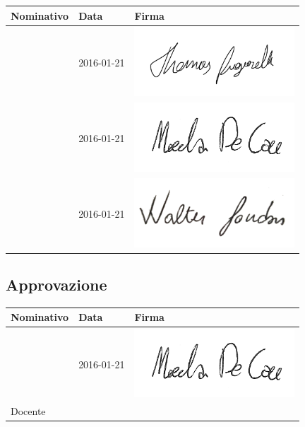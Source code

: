 \documentclass[12pt,a4paper]{article}
\begin{document}
\begin{table}[H]
	\begin{center}
		\begin{tabular}{l l l}
			\toprule
            \textbf{Nominativo}	& \textbf{Data} & \textbf{Firma} \\ \midrule
			\midrule
            \TP{} & 2016-01-21 & \includegraphics[width=6cm]{../img/firmaPigarelli.png} \\ \midrule
            \NDC{} & 2016-01-21 & \includegraphics[width=6cm]{../img/firmaDeCao.png} \\ \midrule
			\WS{} & 2016-01-21 & \includegraphics[width=6cm]{../img/firmaSandon.png} \\
			\bottomrule
		\end{tabular}
	\end{center}
\end{table}

\subsection{Approvazione}

\begin{table}[H]
	\begin{center}
		\begin{tabular}{l l l}
			\toprule
            \textbf{Nominativo}	& \textbf{Data} & \textbf{Firma} \\ \midrule
			\midrule
			\RE{} & 2016-01-21 & \includegraphics[width=6cm]{../img/firmaDeCao.png} \\ \midrule
			Docente &  & \\
		\end{tabular}
	\end{center}
\end{table}
\end{document}
